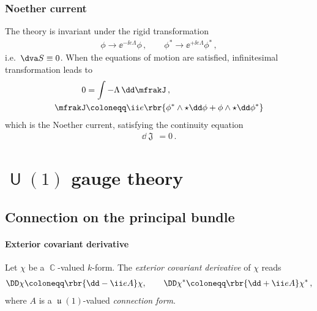 \documentclass[a4paper]{article}
\begin{document}
\subsubsection{Noether current}
The theory is invariant under the rigid transformation
\begin{align}
\phi \to \ee^{-\ii e \Lambda} \phi\,,\qquad
\phi^* \to \ee^{+\ii e \Lambda} \phi^*\,,
\end{align}
i.e.\ $\dva S \equiv 0$. When the equations of motion are satisfied, infinitesimal 
transformation leads to
\begin{align}
0 &= \int -\Lambda\, \dd \mfrakJ\,,
\nonumber \\
\mfrakJ &\coloneqq \ii e\rbr{\phi^*\wedge\star\dd\phi +
\phi\wedge\star\dd\phi^*}
\end{align}
which is the Noether current, satisfying the continuity equation
\begin{align}
\dd \mfrakJ\, = 0\,.
\end{align}

\section[$U(1)$ gauge theory]{$\msansU(1)$ gauge theory}

\subsection{Connection on the principal bundle}

\paragraph{Exterior covariant derivative}
Let $\chi$ be a $\BbbC$-valued $k$-form. The \emph{exterior covariant derivative} of 
$\chi$ reads
\begin{align}
\DD\chi \coloneqq \rbr{\dd - \ii e A}\chi,
\qquad
\DD\chi^* \coloneqq \rbr{\dd + \ii e A}\chi^*\,,
\end{align}
where $A$ is a $\mfraku(1)$-valued \emph{connection form}.
\end{document}

